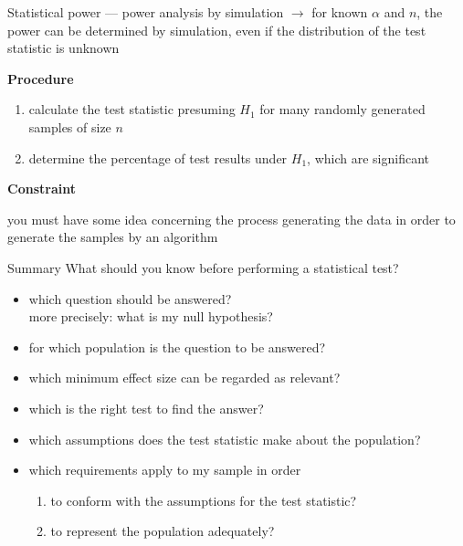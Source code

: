 \documentclass[
  ignorenonframetext,
  aspectratio=169,
  t]{beamer}
\providecommand{\tightlist}{%
  \setlength{\itemsep}{0pt}\setlength{\parskip}{0pt}}
\newcommand{\bluenorm}[1]{\textcolor{bluebeamer}{#1}}
\newcommand{\bluebold}[1]{\textcolor{bluebeamer}{\textbf{#1}}}
\begin{document}
\begin{frame}{Statistical power --- power analysis by simulation}
\protect{}\label{statistical-power-power-analysis-by-simulation}
\(\rightarrow\) for known \(\alpha\) and \(n\), the power can be
determined by simulation, even if the distribution of the test statistic
is unknown

\vspace{0.5cm}

\bluebold{Procedure}

\begin{enumerate}
\tightlist
\item
  calculate the test statistic presuming \(H_1\) for many randomly
  generated samples of size \(n\)
\item
  determine the percentage of test results under \(H_1\), which are
  significant
\end{enumerate}

\pause

\vspace{0.5cm}

\bluebold{Constraint}

you must have some idea concerning the process generating the data in
order to generate the samples by an algorithm
\end{frame}

\begin{frame}{Summary}
\protect{}\label{summary}
What should you know before performing a statistical test?

\begin{callout}
\begin{itemize}
\item \bluenorm{which question should be answered?}\\
more precisely: what is my \bluenorm{null hypothesis}?
\item for which \bluenorm{population} is the question to be answered?
\item which minimum \bluenorm{effect size} can be regarded as \bluenorm{relevant}?
\item which is the \bluenorm{right test} to find the answer?
\item which \bluenorm{assumptions} does the test statistic make about the population?
\item which \bluenorm{requirements} apply to my \bluenorm{sample} in order
\begin{enumerate}
\item to conform with the assumptions for the test statistic?
\item to represent the population adequately?
\end{enumerate}
\end{itemize}
\end{callout}
\end{frame}
\end{document}

